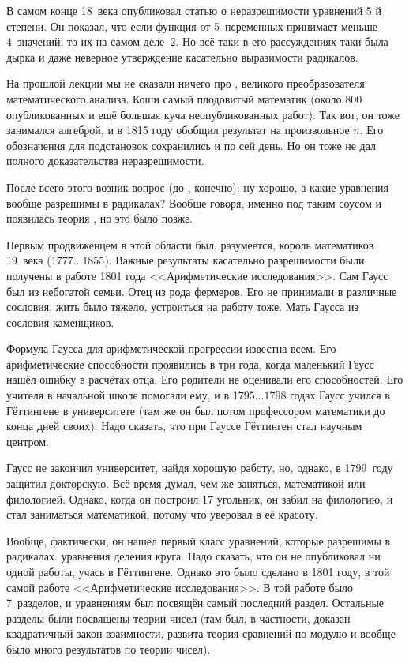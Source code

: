 \documentclass[a4paper,oneside,fleqn,10pt]{article}
\newcommand{\pe}[2]{${#1}\ldots{#2}$}
\begin{document}
В самом конце 18~века  опубликовал статью о неразрешимости уравнений
5 й степени. Он показал, что если функция от 5~переменных принимает меньше 4~значений,
то их на самом деле~2. Но всё таки в его рассуждениях таки была дырка и даже неверное
утверждение касательно выразимости радикалов.

На прошлой лекции мы не сказали ничего про , великого преобразователя математического анализа.
Коши самый плодовитый математик (около 800 опубликованных и ещё большая куча неопубликованных работ).
Так вот, он тоже занимался алгеброй, и в 1815 году обобщил результат  на произвольное $n$.
Его обозначения для подстановок сохранились и по сей день. Но он тоже не дал полного доказательства
неразрешимости.

После всего этого возник вопрос (до , конечно): ну хорошо, а какие уравнения вообще разрешимы
в радикалах? Вообще говоря, именно под таким соусом и появилась теория , но это было позже.

Первым продвиженцем в этой области был, разумеется, король математиков 19~века
 (\pe{1777}{1855}).
Важные результаты касательно разрешимости были получены в работе 1801 года <<Арифметические исследования>>.
Сам Гаусс был из небогатой семьи. Отец из рода фермеров. Его не принимали в различные сословия,
жить было тяжело, устроиться на работу тоже.
Мать Гаусса из сословия каменщиков.

Формула Гаусса для арифметической прогрессии известна всем. Его арифметические способности проявились в три года,
когда маленький Гаусс нашёл ошибку в расчётах отца.
Его родители не оценивали его способностей. Его учителя в начальной школе помогали ему,
и в \pe{1795}{1798} годах Гаусс учился в Гёттингене в университете
(там же он был потом профессором математики до конца дней своих).
Надо сказать, что при Гауссе Гёттинген стал научным центром.

Гаусс не закончил университет, найдя хорошую работу, но, однако, в 1799~году защитил докторскую.
Всё время думал, чем же заняться, математикой или филологией. Однако, когда он построил 17 угольник,
он забил на филологию, и стал заниматься математикой, потому что уверовал в её красоту.

Вообще, фактически, он нашёл первый класс уравнений, которые разрешимы в радикалах: уравнения деления круга.
Надо сказать, что он не опубликовал ни одной работы, учась в Гёттингене.
Однако это было сделано в 1801 году, в той самой работе <<Арифметические исследования>>.
В той работе было 7~разделов, и уравнениям был посвящён самый последний раздел.
Остальные разделы были посвящены теории чисел (там был, в частности, доказан квадратичный закон
взаимности, развита теория сравнений по модулю и вообще было много результатов по теории чисел).
\end{document}

